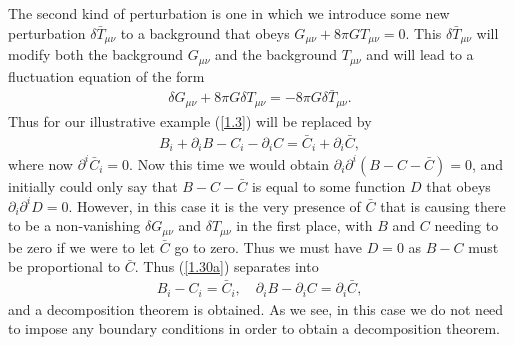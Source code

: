 \documentclass[aps,onecolumn,10pt]{revtex4}
\numberwithin{equation}{section}
\numberwithin{equation}{section}
\begin{document}
The second kind of perturbation is one in which we introduce some new perturbation $\delta \bar{T}_{\mu\nu}$ to a background that obeys $G_{\mu\nu}+8\pi G T_{\mu\nu}=0$. This $\delta \bar{T}_{\mu\nu}$ will modify both the background $G_{\mu\nu}$ and the background $T_{\mu\nu}$ and will lead to a fluctuation equation of the form 
%
\begin{eqnarray}
\delta G_{\mu\nu}+8\pi G \delta T_{\mu\nu}=-8 \pi G \delta \bar{T}_{\mu\nu}. 
\label{1.29a}
\end{eqnarray}
%
Thus for our illustrative example (\ref{1.3}) will be replaced by
%
\begin{eqnarray}
B_i+\partial_iB-C_i-\partial_iC=\bar{C}_i+\partial_i\bar{C},
\label{1.30a}
\end{eqnarray}
%
where now $\partial^i\bar{C}_i=0$. Now this time we would obtain $\partial_i\partial^i(B-C-\bar{C})=0$, and initially could only say that $B-C-\bar{C}$ is equal to some function $D$ that obeys $\partial_i\partial^iD=0$. However, in this case it is the very presence of $\bar{C}$ that is causing there to be a non-vanishing $\delta G_{\mu\nu}$ and $\delta T_{\mu\nu}$ in the first place, with $B$ and $C$ needing to be zero if we were to let $\bar{C}$ go to zero. Thus we must have $D=0$ as $B-C$ must be proportional to  $\bar{C}$. Thus (\ref{1.30a}) separates into 
%
\begin{eqnarray}
B_i-C_i=\bar{C}_i, \quad 
\partial_iB-\partial_iC=\partial_i\bar{C},
\label{1.31a}
\end{eqnarray}
%
and a decomposition theorem is obtained. As we see, in this case we do not need to impose any  boundary conditions in order to obtain a decomposition theorem.
\end{document}
